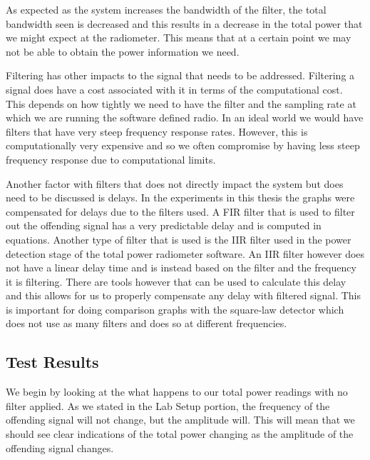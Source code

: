 As expected as the system increases the bandwidth of the filter, the total bandwidth seen is decreased and this results in a decrease in the total power that we might expect at the radiometer.  This means that at a certain point we may not be able to obtain the power information we need.

Filtering has other impacts to the signal that needs to be addressed.  Filtering a signal does have a cost associated with it in terms of the computational cost.  This depends on how tightly we need to have the filter and the sampling rate at which we are running the software defined radio.  In an ideal world we would have filters that have very steep frequency response rates.  However, this is computationally very expensive and so we often compromise by having less steep frequency response due to computational limits.  

Another factor with filters that does not directly impact the system but does need to be discussed is delays.  In the experiments in this thesis the graphs were compensated for delays due to the filters used.  A FIR filter that is used to filter out the offending signal has a very predictable delay and is computed in equations.  Another type of filter that is used is the IIR filter used in the power detection stage of the total power radiometer software.  An IIR filter however does not have a linear delay time and is instead based on the filter and the frequency it is filtering.  There are tools however that can be used to calculate this delay and this allows for us to properly compensate any delay with filtered signal.  This is important for doing comparison graphs with the square-law detector which does not use as many filters and does so at different frequencies.  

\subsection{Test Results}
We begin by looking at the what happens to our total power readings with no filter applied.  As we stated in the Lab Setup portion, the frequency of the offending signal will not change, but the amplitude will.  This will mean that we should see clear indications of the total power changing as the amplitude of the offending signal changes.  

